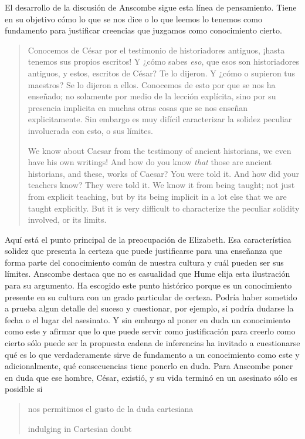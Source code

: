 El desarrollo de la discusión de Anscombe sigue esta línea de pensamiento. Tiene en su objetivo cómo lo que se nos dice o lo que leemos lo tenemos como fundamento para justificar creencias que juzgamos como conocimiento cierto.

\blockquote[We know about Caesar from the testimony of ancient historians, we even have his own writings! And how do you know \emph{that} those are ancient historians, and these, works of Caesar? You were told it. And how did your teachers know? They were told it. We know it from being taught; not just from explicit teaching, but by its being implicit in a lot else that we are taught explicitly. But it is very difficult to characterize the peculiar solidity involved, or its limits.]{Conocemos de César por el testimonio de historiadores antiguos, ¡hasta tenemos sus propios escritos! Y ¿cómo sabes \emph{eso}, que esos son historiadores antiguos, y estos, escritos de César? Te lo dijeron. Y ¿cómo o supieron tus maestros? Se lo dijeron a ellos. Conocemos de esto por que se nos ha enseñado; no solamente por medio de la lección explícita, sino por su presencia implicita en muchas otras cosas que se nos enseñan explicitamente. Sin embargo es muy difícil caracterizar la solidez peculiar involucrada con esto, o sus límites.} Aquí está el punto principal de la preocupación de Elizabeth. Esa característica solidez que presenta la certeza que puede justificarse para una enseñanza que forma parte del conocimiento común de nuestra cultura y cuál pueden ser sus límites. Anscombe destaca que no es casualidad que Hume elija esta ilustración para su argumento. Ha escogido este punto histórico porque es un conocimiento presente en su cultura con un grado particular de certeza. Podría haber sometido a prueba algun detalle del suceso y cuestionar, por ejemplo, si podría dudarse la fecha o el lugar del asesinato. Y sin embargo al poner en duda un conocimiento como este y afirmar que lo que puede servir como justificación para creerlo como cierto sólo puede ser la propuesta cadena de inferencias ha invitado a cuestionarse qué es lo que verdaderamente sirve de fundamento a un conocimiento como este y adicionalmente, qué consecuencias tiene ponerlo en duda. Para Anscombe poner en duda que ese hombre, César, existió, y su vida terminó en un asesinato sólo es posidble si \blockquote[indulging in Cartesian doubt]{nos permitimos el gusto de la duda cartesiana}.

